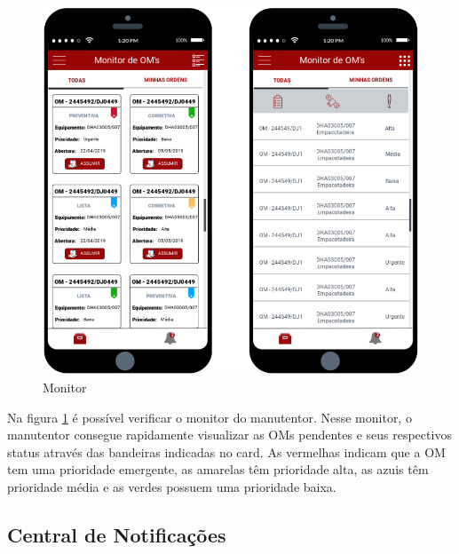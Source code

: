 {\begin{figure}[htb]
	\caption{\label{mobile_monitor}Monitor}
	\begin{center}
		\includegraphics[scale=0.75]{./Figuras/mobile/monitor.png}
	\end{center}
\end{figure}

Na figura \ref{mobile_monitor} é possível verificar o monitor do manutentor. Nesse monitor, o manutentor consegue rapidamente visualizar as OMs pendentes e seus respectivos status através das bandeiras indicadas no card. As  vermelhas indicam que a OM tem uma prioridade emergente, as amarelas têm prioridade alta, as azuis têm prioridade média e as verdes possuem uma prioridade baixa.

\newpage
\subsection{Central de Notificações}

}
